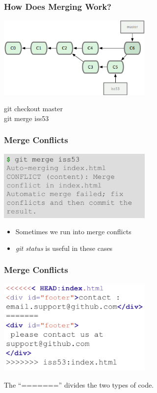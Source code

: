 \begin{frame}
\frametitle{\large How Does Merging Work?}
\begin{center}
\includegraphics[width=0.57\textwidth]{img/branching_images/f8.png}
\end{center}
\vspace{2mm}
\begin{center}
git checkout master \\
git merge iss53
\end{center}
\end{frame}
\note{}

\begin{frame}
\frametitle{\large Merge Conflicts}
\begin{center}
\includegraphics[width=0.57\textwidth]{img/branching_images/merge1.png}
\end{center}
\vspace{2mm}
\begin{itemize}
\item Sometimes we run into merge conflicts
\item \emph{git status} is useful in these cases
\end{itemize}
\end{frame}
\note{}

\begin{frame}
\frametitle{\large Merge Conflicts}
\begin{center}
\includegraphics[width=0.57\textwidth]{img/branching_images/merge2.png}
\end{center}
\vspace{2mm}
\begin{center}
The ``======='' divides the two types of code.
\end{center}
\end{frame}
\note{}
